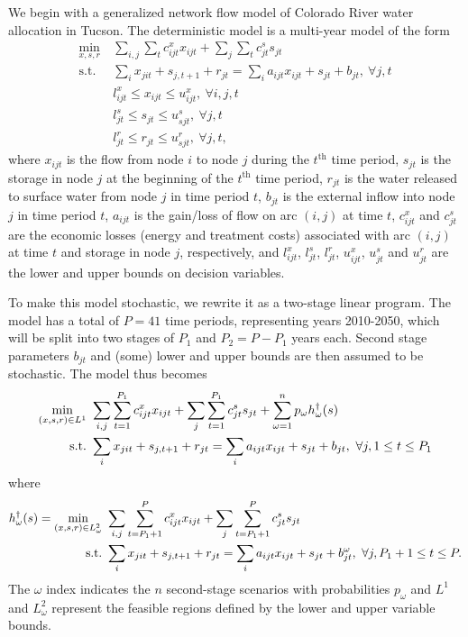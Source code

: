 \documentclass[11pt]{article}
\newcommand{\st}{\mbox{s.t.}}
\begin{document}
We begin with a generalized network flow model of Colorado River water allocation in Tucson.
The deterministic model is a multi-year model of the form
\begin{align*}
	\min_{x,s,r} \ & \sum_{i,j} \sum_t c_{ijt}^x x_{ijt} + \sum_{j} \sum_{t} c_{jt}^s s_{jt}\\
	\st \ & \sum_i x_{jit} + s_{j,t+1} + r_{jt} = \sum_i a_{ijt} x_{ijt} + s_{jt} + b_{jt}, \ \forall j,t \\
	& l_{ijt}^x \leq x_{ijt} \leq u_{ijt}^x, \ \forall i,j,t \\
	& l_{jt}^s \leq s_{jt} \leq u_{sjt}^s, \ \forall j,t \\
	& l_{jt}^r \leq r_{jt} \leq u_{sjt}^r, \ \forall j,t,
\end{align*}
where $x_{ijt}$ is the flow from node $i$ to node $j$ during the $t^{\text{th}}$ time period, $s_{jt}$ is the storage in node $j$ at the beginning of the $t^{\text{th}}$ time period, $r_{jt}$ is the water released to surface water from node $j$ in time period $t$, $b_{jt}$ is the external inflow into node $j$ in time period $t$, $a_{ijt}$ is the gain/loss of flow on arc $(i,j)$ at time $t$, $c_{ijt}^x$ and $c_{jt}^s$ are the economic losses (energy and treatment costs) associated with arc $(i,j)$ at time $t$ and storage in node $j$, respectively, and $l_{ijt}^x$, $l_{jt}^s$, $l_{jt}^r$, $u_{ijt}^x$, $u_{jt}^s$ and $u_{jt}^r$ are the lower and upper bounds on decision variables.

To make this model stochastic, we rewrite it as a two-stage linear program.
The model has a total of $P = 41$ time periods, representing years 2010-2050, which will be split into two stages of $P_1$ and $P_2 = P - P_1$ years each.
Second stage parameters $b_{jt}$ and (some) lower and upper bounds are then assumed to be stochastic.
The model thus becomes
\begin{align}
	\min_{(x,s,r) \in L^1} \ & \sum_{i,j} \sum_{t=1}^{P_1} c_{ijt}^x x_{ijt} + \sum_{j} \sum_{t=1}^{P_1} c_{jt}^s s_{jt} + \sum_{\omega=1}^n p_\omega h^\dagger_\omega(s) \label{eq:gen_network_two_stage} \\
	\st \ & \sum_i x_{jit} + s_{j,t+1} + r_{jt} = \sum_i a_{ijt} x_{ijt} + s_{jt} + b_{jt}, \ \forall j, 1 \leq t \leq P_1 \notag
\end{align}
where
\begin{align}
	h^\dagger_\omega(s) = \min_{(x,s,r) \in L^2_\omega} \ & \sum_{i,j} \sum_{t=P_1+1}^{P} c_{ijt}^x x_{ijt} + \sum_{j} \sum_{t=P_1+1}^{P} c_{jt}^s s_{jt} \label{eq:gen_network_second_stage} \\
	\st \ & \sum_i x_{jit} + s_{j,t+1} + r_{jt} = \sum_i a_{ijt} x_{ijt} + s_{jt} + b_{jt}^\omega, \ \forall j, P_1+1 \leq t \leq P. \notag
\end{align}
The $\omega$ index indicates the $n$ second-stage scenarios with probabilities $p_\omega$ and $L^1$ and $L^2_\omega$ represent the feasible regions defined by the lower and upper variable bounds.
\end{document}
